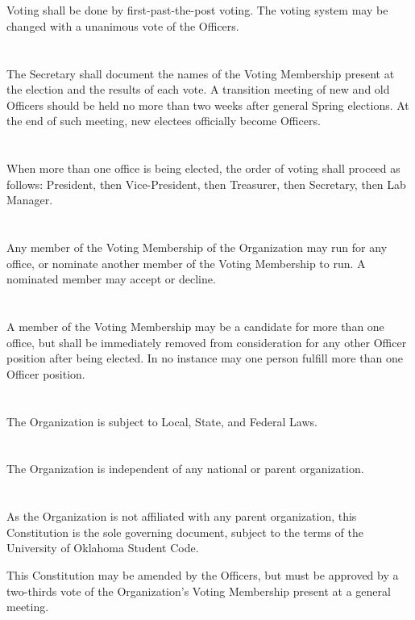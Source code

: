 \documentclass[12pt]{cls/constitution}
\begin{document}
\section{}
Voting shall be done by first-past-the-post voting. The voting system may be changed with a unanimous vote of the Officers.

\section{}
The Secretary shall document the names of the Voting Membership present at the election and the results of each vote. A transition meeting of new and old Officers should be held no more than two weeks after general Spring elections. At the end of such meeting, new electees officially become Officers.

\section{}
When more than one office is being elected, the order of voting shall proceed as follows: President, then Vice-President, then Treasurer, then Secretary, then Lab Manager.

\section{}
Any member of the Voting Membership of the Organization may run for any office, or nominate another member of the Voting Membership to run. A nominated member may accept or decline.

\section{}
A member of the Voting Membership may be a candidate for more than one office, but shall be immediately removed from consideration for any other Officer position after being elected. In no instance may one person fulfill more than one Officer position. 


\section{}
The Organization is subject to Local, State, and Federal Laws.

\section{}
The Organization is independent of any national or parent organization.

\section{}
As the Organization is not affiliated with any parent organization, this Constitution is the sole governing document, subject to the terms of the University of Oklahoma Student Code.

This Constitution may be amended by the Officers, but must be approved by a two-thirds vote of the Organization’s Voting Membership present at a general meeting. 
\end{document}
